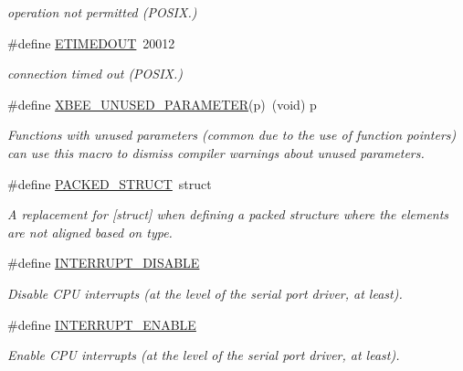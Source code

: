 \begin{DoxyCompactItemize}
\begin{DoxyCompactList}\small\item\em operation not permitted (P\-O\-S\-I\-X.) \end{DoxyCompactList}\item 
\hypertarget{group__hal_ga597718e59a8fc9c4d4ab63f5a34e28b1}{\#define \hyperlink{group__hal_ga597718e59a8fc9c4d4ab63f5a34e28b1}{E\-T\-I\-M\-E\-D\-O\-U\-T}~20012}\label{group__hal_ga597718e59a8fc9c4d4ab63f5a34e28b1}

\begin{DoxyCompactList}\small\item\em connection timed out (P\-O\-S\-I\-X.) \end{DoxyCompactList}\end{DoxyCompactItemize}
\begin{DoxyCompactItemize}
\item 
\#define \hyperlink{group__hal_gacddb73dac3fd1bdec26cd7dc0a652c00}{X\-B\-E\-E\-\_\-\-U\-N\-U\-S\-E\-D\-\_\-\-P\-A\-R\-A\-M\-E\-T\-E\-R}(p)~(void) p
\begin{DoxyCompactList}\small\item\em Functions with unused parameters (common due to the use of function pointers) can use this macro to dismiss compiler warnings about unused parameters. \end{DoxyCompactList}\item 
\#define \hyperlink{group__hal_ga4233297bd31be5c273d4fb0758cc54d7}{P\-A\-C\-K\-E\-D\-\_\-\-S\-T\-R\-U\-C\-T}~struct
\begin{DoxyCompactList}\small\item\em A replacement for \mbox{[}struct\mbox{]} when defining a packed structure where the elements are not aligned based on type. \end{DoxyCompactList}\item 
\hypertarget{group__hal_ga658c3ad175b50000ac44b3b9ea836d1a}{\#define \hyperlink{group__hal_ga658c3ad175b50000ac44b3b9ea836d1a}{I\-N\-T\-E\-R\-R\-U\-P\-T\-\_\-\-D\-I\-S\-A\-B\-L\-E}}\label{group__hal_ga658c3ad175b50000ac44b3b9ea836d1a}

\begin{DoxyCompactList}\small\item\em Disable C\-P\-U interrupts (at the level of the serial port driver, at least). \end{DoxyCompactList}\item 
\#define \hyperlink{group__hal_gacf43057fc38f77d20456c074909ba772}{I\-N\-T\-E\-R\-R\-U\-P\-T\-\_\-\-E\-N\-A\-B\-L\-E}
\begin{DoxyCompactList}\small\item\em Enable C\-P\-U interrupts (at the level of the serial port driver, at least). \end{DoxyCompactList}\end{DoxyCompactItemize}
